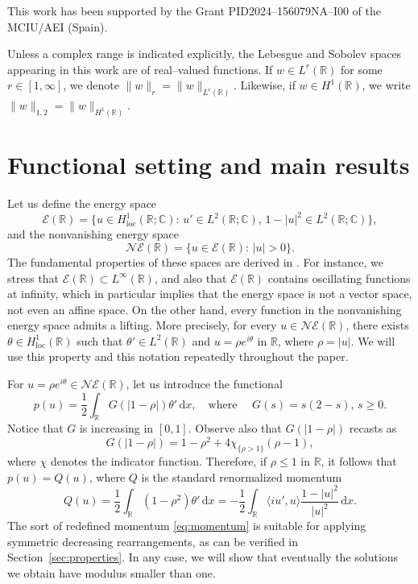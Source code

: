 \documentclass[11pt]{article}
\newcommand{\C}{\mathbb{C}}
\newcommand{\R}{\mathbb{R}}
\newcommand{\boE}{\mathcal{E}}
\newcommand{\NE}{\mathcal{NE}(\mathbb{R})}
\renewcommand{\d}{\,\mathrm{d}}
\newcommand{\loc}{\operatorname{loc}}
\theoremstyle{plain}
\theoremstyle{definition}
\theoremstyle{remark}
\numberwithin{equation}{section}
\begin{document}
{\medskip
{
 This work has been supported by the Grant PID2024--156079NA--I00 of the MCIU/AEI (Spain).
}

\medskip

 Unless a complex range is indicated explicitly, the Lebesgue and Sobolev  spaces appearing in this work are of real--valued functions. If $w\in L^r(\R)$ for some $r\in [1,\infty]$, we denote $\|w\|_r=\|w\|_{L^r(\R)}$. Likewise, if $w\in H^1(\R)$, we write $\|w\|_{1,2}=\|w\|_{H^1(\R)}$. 





\section{Functional setting and main results}\label{sec:statements}

Let us define the energy space
\[\boE(\R)=\{u\in H^1_{\loc}(\R;\C):\, u'\in L^2(\R;\C),\, 1-|u|^2\in L^2(\R;\C)\},\]
and the nonvanishing energy space
\[\NE=\{u\in\boE(\R):\, |u|>0\}.\]
The fundamental properties of these spaces are derived in \cite{gerardenergyspace}. For instance, we stress that $\boE(\R)\subset L^\infty(\R)$, and also that $\boE(\R)$ contains oscillating functions at infinity, which in particular implies that the energy space is not a vector space, not even an affine space. On the other hand, every function in the nonvanishing energy space admits a lifting. More precisely, for every $u\in\NE$, there exists $\theta\in H^1_{\loc}(\R)$ such that $\theta'\in L^2(\R)$ and $u=\rho e^{i\theta}$ in $\R$, where $\rho=|u|$. We will use this property and this notation repeatedly throughout the paper.

For $u=\rho e^{i\theta}\in\NE$, let us introduce the functional
\begin{equation}\label{eq:momentum}
p(u)=\frac12\int_\R G(|1-\rho|)\theta'\d x,\quad\text{where }\quad G(s)=s(2-s),\, s\geq 0.
\end{equation}
Notice that $G$ is increasing in $[0,1]$. Observe also that $G(|1-\rho|)$ recasts as
\begin{equation}\label{eq:recastmomentum}
    G(|1-\rho|)=1-\rho^2  + 4\chi_{\{\rho>1\}}(\rho-1),
\end{equation}
where $\chi$ denotes the indicator function. Therefore, if $\rho\leq 1$ in $\R$, it follows that $p(u)=Q(u)$, where $Q$ is the standard renormalized momentum \cite{bethuel0}
\begin{equation}\label{eq:usualmomentum}
Q(u)=\frac12\int_\R(1-\rho^2)\theta'\d x=-\frac12\int_\R\langle iu',u\rangle\frac{1-|u|^2}{|u|^2}\d x.
\end{equation}
The sort of redefined momentum \eqref{eq:momentum} is suitable for applying symmetric decreasing rearrangements, as can be verified in Section~\ref{sec:properties}. In any case, we will show that eventually the solutions we obtain have modulus smaller than one.

}
\end{document}
